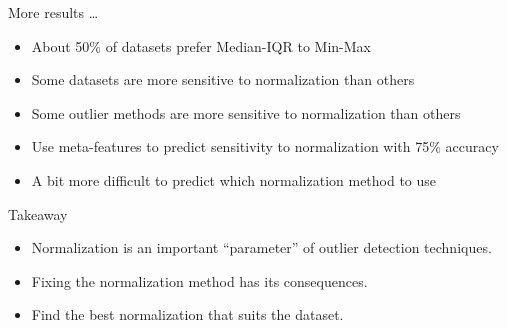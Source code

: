 \documentclass{beamer}
\begin{document}
\begin{darkframes}
 	\begin{frame}{More results \ldots}
 	\begin{itemize}
 	    \item About 50\% of datasets prefer Median-IQR  to Min-Max
 	    \item Some datasets are more sensitive to normalization than others
 	    \item Some outlier methods are more sensitive to normalization than others
 	    \item Use meta-features to predict sensitivity to normalization with 75\% accuracy
 	    \item A bit more difficult to predict which normalization method to use
 	\end{itemize}
 	    
 	\end{frame}	
 	\begin{frame}{Takeaway}
 	    \begin{itemize}
 			\item 	Normalization is an important ``parameter'' of outlier detection techniques.
 			\vspace{0.5cm}
 			\item  Fixing the normalization method has its consequences.
 			\vspace{0.5cm}
 			\item  Find the best normalization that suits the dataset.
 		\end{itemize}
 		 
 	\end{frame}
 		
 	\begin{frame}[noframenumbering,plain,label=figsnorm]
		\begin{figure}[b]
		\centering
\end{figure}
\end{frame}
\end{darkframes}
\end{document}
